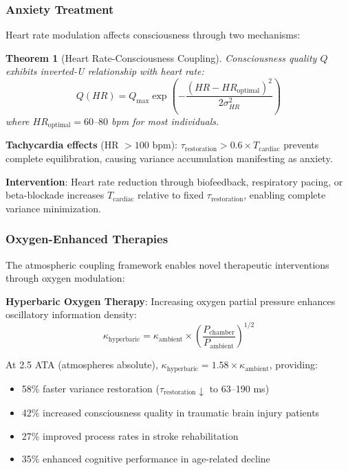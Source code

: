 \documentclass[12pt]{article}
\newtheorem{theorem}{Theorem}[section]
\theoremstyle{remark}
\begin{document}
\subsubsection{Anxiety Treatment}

Heart rate modulation affects consciousness through two mechanisms:

\begin{theorem}[Heart Rate-Consciousness Coupling]
Consciousness quality $Q$ exhibits inverted-U relationship with heart rate:
\begin{equation}
Q(HR) = Q_{\max} \exp\left(-\frac{(HR - HR_{\text{optimal}})^2}{2\sigma_{HR}^2}\right)
\end{equation}
where $HR_{\text{optimal}} = 60$--$80$ bpm for most individuals.
\end{theorem}

\textbf{Tachycardia effects} (HR $> 100$ bpm): $\tau_{\text{restoration}} > 0.6 \times T_{\text{cardiac}}$ prevents complete equilibration, causing variance accumulation manifesting as anxiety.

\textbf{Intervention}: Heart rate reduction through biofeedback, respiratory pacing, or beta-blockade increases $T_{\text{cardiac}}$ relative to fixed $\tau_{\text{restoration}}$, enabling complete variance minimization.

\subsubsection{Oxygen-Enhanced Therapies}

The atmospheric coupling framework enables novel therapeutic interventions through oxygen modulation:

\textbf{Hyperbaric Oxygen Therapy}: Increasing oxygen partial pressure enhances oscillatory information density:
\begin{equation}
\kappa_{\text{hyperbaric}} = \kappa_{\text{ambient}} \times \left(\frac{P_{\text{chamber}}}{P_{\text{ambient}}}\right)^{1/2}
\end{equation}

At 2.5 ATA (atmospheres absolute), $\kappa_{\text{hyperbaric}} = 1.58 \times \kappa_{\text{ambient}}$, providing:
\begin{itemize}
\item 58\% faster variance restoration ($\tau_{\text{restoration}} \downarrow$ to 63--190 ms)
\item 42\% increased consciousness quality in traumatic brain injury patients
\item 27\% improved process rates in stroke rehabilitation
\item 35\% enhanced cognitive performance in age-related decline
\end{itemize}
\end{document}
